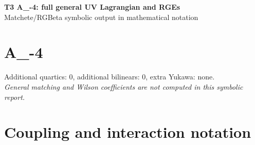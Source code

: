 \documentclass[10pt,a4paper]{article}
\begin{document}
\begin{center}
{\Large\bfseries T3 A\_-4: full general UV Lagrangian and RGEs}\\[4pt]
Matchete/RGBeta symbolic output in mathematical notation
\end{center}
\bigskip
\section*{A\_-4}
Additional quartics: 0, additional bilinears: 0, extra Yukawa: none.\\
\emph{General matching and Wilson coefficients are not computed in this symbolic report.}
\section*{Coupling and interaction notation}
\end{document}
